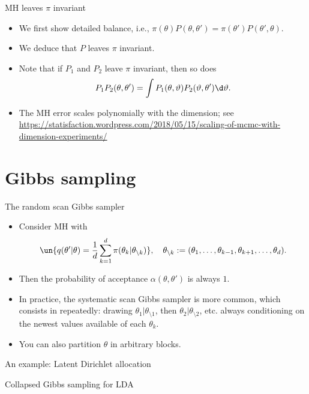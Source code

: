 \documentclass[10pt]{beamer}
\begin{document}
\begin{frame}{MH leaves $\pi$ invariant}
\begin{itemize}
  \item We first show detailed balance, i.e., $\pi(\theta)P(\theta,\theta') = \pi(\theta')P(\theta',\theta).$
  \vfill
  \vfill
  \vfill
  \vfill
  \item We deduce that $P$ leaves $\pi$ invariant.
  \vfill
  \vfill
  \vfill
  \vfill
  \item Note that if $P_1$ and $P_2$ leave $\pi$ invariant, then so does
  $$
  P_1P_2 (\theta,\theta') = \int P_1(\theta,\vartheta)P_2(\vartheta,\theta')\d\vartheta.
  $$
  \item The MH error scales polynomially with the dimension; see \href{P. Jacob's blog post}{https://statisfaction.wordpress.com/2018/05/15/scaling-of-mcmc-with-dimension-experiments/}

\end{itemize}
\end{frame}

\section{Gibbs sampling}
\begin{frame}{The random scan Gibbs sampler}
\begin{itemize}
\item Consider MH with
$$
\un{q(\theta'\vert\theta) = \frac1d \sum_{k=1}^d \pi(\theta_k\vert \theta_{\setminus k})}, \quad \theta_{\setminus k}:= (\theta_1,\dots,\theta_{k-1},\theta_{k+1},\dots,\theta_d).
$$
\item Then the probability of acceptance $\alpha(\theta,\theta')$ is always $1$.
$$$$
\vfill
\item In practice, the systematic scan Gibbs sampler is more common, which consists in repeatedly: drawing $\theta_1\vert\theta_{\setminus 1}$, then $\theta_2\vert\theta_{\setminus 2}$, etc. always conditioning on the newest values available of each $\theta_k$.
\item You can also partition $\theta$ in arbitrary blocks.
\end{itemize}
\end{frame}

\begin{frame}{An example: Latent Dirichlet allocation}

\end{frame}

\begin{frame}{Collapsed Gibbs sampling for LDA}

\end{frame}
\end{document}
